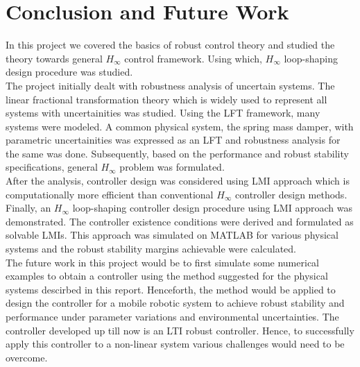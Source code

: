 \documentclass[a4paper,12pt]{article}
\begin{document}
	\section{Conclusion and Future Work}

In this project we covered the basics of robust control theory and studied the theory towards general $H_{\infty}$ control framework. Using which, $H_{\infty}$ loop-shaping design procedure was studied.\\ The project initially dealt with robustness analysis of uncertain systems. The linear fractional transformation theory which is widely used to represent all systems with uncertainities was studied. Using the LFT framework, many systems were modeled. A common physical system, the spring mass damper, with parametric uncertainities was expressed as an LFT and robustness analysis for the same was done. Subsequently, based on the performance and robust stability specifications, general $H_{\infty}$ problem was formulated.  \\After the analysis, controller design was considered using LMI approach which is computationally more efficient than conventional $H_{\infty}$ controller design methods. Finally, an $H_{\infty}$ loop-shaping controller design procedure using LMI approach was demonstrated. The controller existence conditions were derived and formulated as solvable LMIs. This approach was simulated on MATLAB for various physical systems and the robust stability margins achievable were calculated. \\ The future work in this project would be to first simulate some numerical examples to obtain a controller using the method suggested for the physical systems descirbed in this report. Henceforth, the method would be applied to design the controller for a mobile robotic system to achieve robust stability and performance under parameter variations and environmental uncertainties. The controller developed up till now is an LTI robust controller. Hence, to successfully apply this controller to a non-linear system various challenges would need to be overcome.
\printbibliography 
\end{document}

